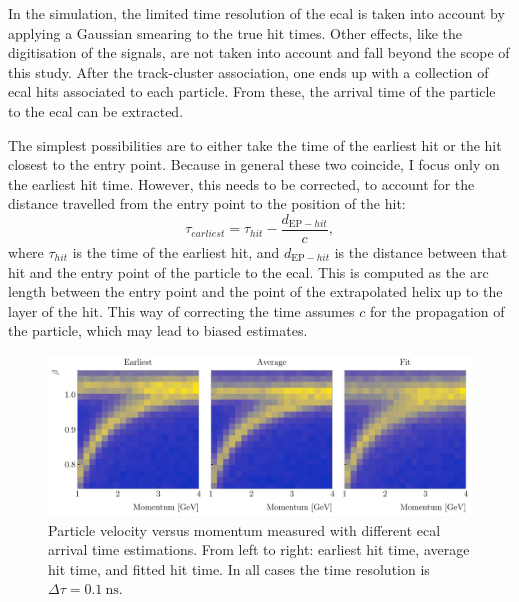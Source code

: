In the simulation, the limited time resolution of the \gls{ecal} is taken into account by applying a Gaussian smearing to the true hit times. Other effects, like the digitisation of the signals, are not taken into account and fall beyond the scope of this study. After the track-cluster association, one ends up with a collection of \gls{ecal} hits associated to each particle. From these, the arrival time of the particle to the \gls{ecal} can be extracted.

The simplest possibilities are to either take the time of the earliest hit or the hit closest to the entry point. Because in general these two coincide, I focus only on the earliest hit time. However, this needs to be corrected, to account for the distance travelled from the entry point to the position of the hit:
\begin{equation}\label{8.22}
	\tau_{earliest} = \tau_{hit} - \frac{d_{\mathrm{EP}-hit}}{c},
\end{equation}
where $\tau_{hit}$ is the time of the earliest hit, and $d_{\mathrm{EP}-hit}$ is the distance between that hit and the entry point of the particle to the \gls{ecal}. This is computed as the arc length between the entry point and the point of the extrapolated helix up to the layer of the hit. This way of correcting the time assumes $c$ for the propagation of the particle, which may lead to biased estimates.

\begin{figure}[t]
	\centering
	\includegraphics[width=.99\linewidth]{Images/GArSoft_PID/tof/beta_vs_momentum_comparison_delta_0.1.pdf}
	\caption[Particle velocity versus momentum measured with different \gls{ecal} arrival time estimations.]{Particle velocity versus momentum measured with different \gls{ecal} arrival time estimations. From left to right: earliest hit time, average hit time, and fitted hit time. In all cases the time resolution is $\Delta \tau = 0.1 ~ \mathrm{ns}$.}
	\label{fig:tof_beta_comp}
\end{figure}

